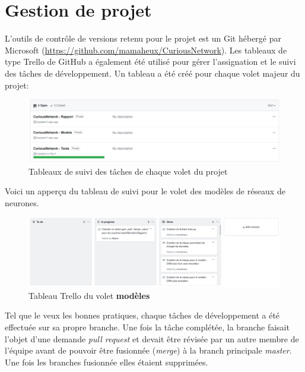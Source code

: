 \section{Gestion de projet}
L'outils de contrôle de versions retenu pour le projet est un Git hébergé par Microsoft (\href{https://github.com/mamaheux/CuriousNetwork}{https://github.com/mamaheux/CuriousNetwork}). Les tableaux de type Trello de GitHub a également été utilisé pour gérer l'assignation et le suivi des tâches de développement. Un tableau a été créé pour chaque volet majeur du projet:

    \begin{figure}[H]
        \centering
        \includegraphics[width=15cm]{images/3_sub_projects.png}
        \caption{Tableaux de suivi des tâches de chaque volet du projet}
        \label{fig:trello_boards}
    \end{figure}

Voici un apperçu du tableau de suivi pour le volet des modèles de réseaux de neurones.
    \begin{figure}[H]
        \centering
        \includegraphics[width=15cm]{images/trello_board.png}
        \caption{Tableau Trello du volet \textbf{modèles}}
        \label{fig:trello_boards}
    \end{figure}

Tel que le veux les bonnes pratiques, chaque tâches de développement a été effectuée sur sa propre branche. Une fois la tâche complétée, la branche faisait l'objet d'une demande \textit{pull request} et devait être révisée par un autre membre de l'équipe avant de pouvoir être fusionnée (\textit{merge}) à la branch principale \textit{master}. Une fois les branches fusionnée elles étaient supprimées.

